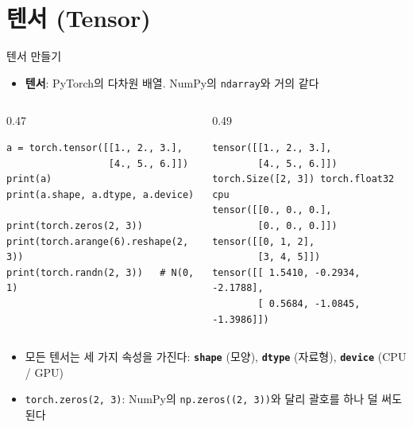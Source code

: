 \documentclass[aspectratio=169,11pt]{beamer}
\newcommand{\code}[1]{\texttt{#1}}
\begin{document}
\section{텐서 (Tensor)}

\begin{frame}[fragile]{텐서 만들기}
\begin{itemize}
\item \textbf{텐서}: PyTorch의 다차원 배열. NumPy의 \code{ndarray}와 거의 같다
\end{itemize}
\begin{columns}[T,onlytextwidth]
\begin{column}{0.47\textwidth}
\begin{lstlisting}
a = torch.tensor([[1., 2., 3.],
                  [4., 5., 6.]])
print(a)
print(a.shape, a.dtype, a.device)

print(torch.zeros(2, 3))
print(torch.arange(6).reshape(2, 3))
print(torch.randn(2, 3))   # N(0, 1)
\end{lstlisting}
\end{column}
\begin{column}{0.49\textwidth}
\begin{lstlisting}[style=outstyle]
tensor([[1., 2., 3.],
        [4., 5., 6.]])
torch.Size([2, 3]) torch.float32 cpu
tensor([[0., 0., 0.],
        [0., 0., 0.]])
tensor([[0, 1, 2],
        [3, 4, 5]])
tensor([[ 1.5410, -0.2934, -2.1788],
        [ 0.5684, -1.0845, -1.3986]])
\end{lstlisting}
\end{column}
\end{columns}
\vskip1mm
\begin{itemize}
\item 모든 텐서는 세 가지 속성을 가진다: \textbf{\code{shape}} (모양), \textbf{\code{dtype}} (자료형), \textbf{\code{device}} (CPU / GPU)
\item \code{torch.zeros(2, 3)}: NumPy의 \code{np.zeros((2, 3))}와 달리 괄호를 하나 덜 써도 된다
\end{itemize}
\end{frame}
\end{document}
